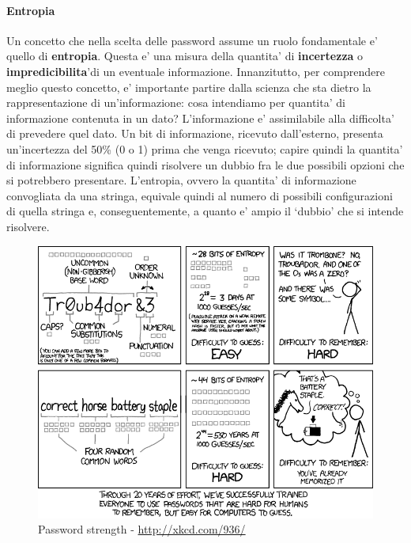\paragraph{Entropia}
Un concetto che nella scelta delle password assume un ruolo fondamentale e' quello di \textbf{entropia}. Questa e' una misura della quantita' di \textbf{incertezza} o \textbf{impredicibilita}'di un eventuale informazione. Innanzitutto, per comprendere meglio questo concetto, e' importante partire dalla scienza che sta dietro la rappresentazione di un'informazione: cosa intendiamo per quantita' di informazione contenuta in un dato? L'informazione e' assimilabile alla difficolta' di prevedere quel dato. Un bit di informazione, ricevuto dall'esterno, presenta un'incertezza del 50\% (0 o 1) prima che venga ricevuto; capire quindi la quantita' di informazione significa quindi risolvere un dubbio fra le due possibili opzioni che si potrebbero presentare. L'entropia, ovvero la quantita' di informazione convogliata da una stringa, equivale quindi al numero di possibili configurazioni di quella stringa e, conseguentemente, a quanto e' ampio il `dubbio' che si intende risolvere.
\begin{figure}[H]
	\centering
	\includegraphics[scale=0.5]{img/entropiaxkcd.png}
	\caption{Password strength - \url{http://xkcd.com/936/}}\label{entropy}
\end{figure}
